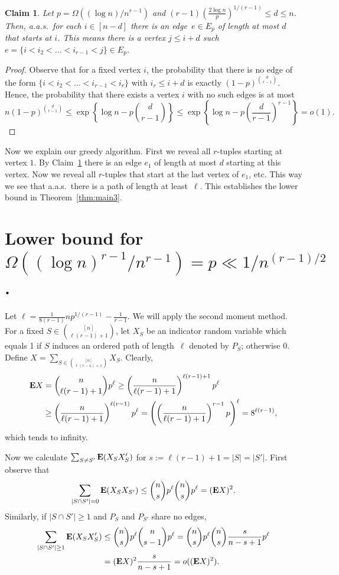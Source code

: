 \documentclass[12pt,reqno]{amsart}
\newtheorem{claim}[theorem]{Claim}
\theoremstyle{remark}
\def\E{\mbox{{\bf E}}}
\def\E{\mbox{{\bf E}}}
\begin{document}
\begin{claim}\label{claim:length_e}
Let $p=\Omega((\log n)/n^{r-1})$ and $(r-1)\left(\frac{2\log n}{p} \right)^{1/(r-1)} \le d \le n$. Then, a.a.s.\ for each $i\in[n-d]$ there is an edge~$e\in E_p$ of length at most $d$ that starts at $i$. This means there is a vertex $j\le i+d$ such $e=\{i<i_2<\dots<i_{r-1}<j\}\in E_p$.
\end{claim}
\begin{proof}
Observe that for a fixed vertex $i$, the probability that there is no edge of the form $\{i<i_2<\dots<i_{r-1}<i_r\}$ with $i_r\le i+d$ is exactly $(1-p)^{\binom{d}{r-1}}$. Hence, the probability that there exists a vertex $i$ with no such edges is at most
\[
n (1-p)^{\binom{d}{r-1}} \le \exp\left\{\log n - p\binom{d}{r-1}\right\}
\le \exp\left\{\log n - p\left(\frac{d}{r-1}\right)^{r-1}\right\} = o(1).
\]
\end{proof}
Now we explain our greedy algorithm. First we reveal all $r$-tuples starting at vertex $1$. By Claim~\ref{claim:length_e} there is an edge $e_1$ of length at most $d$ starting at this vertex. Now we reveal all $r$-tuples that start at the last vertex of $e_1$, etc. This way we see that a.a.s.\ there is a path of length at least~$\ell$. This establishes the lower bound in Theorem~\ref{thm:main3}.

\section{Lower bound for $\Omega((\log n)^{r-1}/n^{r-1}) = p \ll 1/n^{(r-1)/2}$.}\label{sec:second_moment}\label{sec:5}

Let $\ell =  \frac{1}{8(r-1)}np^{1/(r-1)}-\frac{1}{r-1}$.
We will apply the second moment method. For a fixed $S\in \binom{[n]}{\ell(r-1)+1}$, let $X_S$ be an indicator random variable which equals 1 if $S$ induces an ordered path of length~$\ell$ denoted by $P_S$; otherwise 0. Define $X=\sum_{S\in \binom{[n]}{\ell(r-1)+1}} X_S$.
Clearly,
\begin{align*}
\E X &= \binom{n}{\ell(r-1)+1}p^\ell
\ge \left(\frac{n}{\ell(r-1)+1}\right)^{\ell(r-1)+1}p^\ell\\
&\ge \left(\frac{n}{\ell(r-1)+1}\right)^{\ell(r-1)}p^\ell
= \left(\left(\frac{n}{\ell(r-1)+1}\right)^{r-1}p\right)^{\ell} = 8^{\ell(r-1)},
\end{align*}
which tends to infinity.

Now we calculate $\sum_{S\neq S'} \E (X_SX_S')$ for $s:=\ell(r-1)+1=|S|=|S'|$. First observe that 
\[
\sum_{|S \cap S'|=0} \E (X_SX_{S'}) \le \binom{n}{s}p^\ell \binom{n}{s}p^\ell = (\E X)^2.
\]
Similarly, if $|S \cap S'|\ge 1$ and $P_S$ and $P_{S'}$ share no edges,
\begin{align*}
\sum_{|S \cap S'|\ge 1} \E (X_SX_S') 
&\le \binom{n}{s}p^\ell \binom{n}{s-1}p^\ell =\binom{n}{s}p^\ell \binom{n}{s}\frac{s}{n-s+1}  p^\ell \\
& = (\E X)^2 \frac{s}{n-s+1} = o((\E X)^2).
\end{align*}
\end{document}
